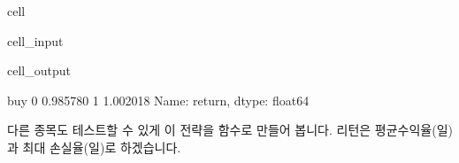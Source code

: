 \documentclass[letterpaper,10pt,english]{jupyterBook}
\begin{document}
\begin{sphinxuseclass}{cell}\begin{sphinxVerbatimInput}

\begin{sphinxuseclass}{cell_input}
\begin{sphinxVerbatim}[commandchars=\\\{\}]
\PYG{p}{[}\PYG{p}{]}
\end{sphinxVerbatim}

\end{sphinxuseclass}\end{sphinxVerbatimInput}
\begin{sphinxVerbatimOutput}

\begin{sphinxuseclass}{cell_output}
\begin{sphinxVerbatim}[commandchars=\\\{\}]
buy
0    0.985780
1    1.002018
Name: return, dtype: float64
\end{sphinxVerbatim}

\end{sphinxuseclass}\end{sphinxVerbatimOutput}

\end{sphinxuseclass}
\sphinxAtStartPar
 다른 종목도 테스트할 수 있게 이 전략을 함수로 만들어 봅니다. 리턴은 평균수익율(일) 과 최대 손실율(일)로 하겠습니다.
\end{document}
